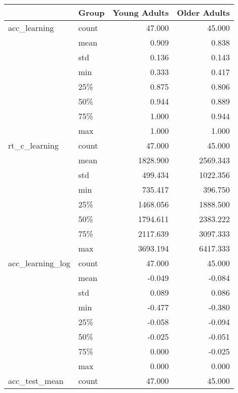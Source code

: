 \begin{tabular}{llrr}
\toprule
                  & Group &  Young Adults &  Older Adults \\
\midrule
acc\_learning & count &        47.000 &        45.000 \\
                  & mean &         0.909 &         0.838 \\
                  & std &         0.136 &         0.143 \\
                  & min &         0.333 &         0.417 \\
                  & 25\% &         0.875 &         0.806 \\
                  & 50\% &         0.944 &         0.889 \\
                  & 75\% &         1.000 &         0.944 \\
                  & max &         1.000 &         1.000 \\
rt\_c\_learning & count &        47.000 &        45.000 \\
                  & mean &      1828.900 &      2569.343 \\
                  & std &       499.434 &      1022.356 \\
                  & min &       735.417 &       396.750 \\
                  & 25\% &      1468.056 &      1888.500 \\
                  & 50\% &      1794.611 &      2383.222 \\
                  & 75\% &      2117.639 &      3097.333 \\
                  & max &      3693.194 &      6417.333 \\
acc\_learning\_log & count &        47.000 &        45.000 \\
                  & mean &        -0.049 &        -0.084 \\
                  & std &         0.089 &         0.086 \\
                  & min &        -0.477 &        -0.380 \\
                  & 25\% &        -0.058 &        -0.094 \\
                  & 50\% &        -0.025 &        -0.051 \\
                  & 75\% &         0.000 &        -0.025 \\
                  & max &         0.000 &         0.000 \\
acc\_test\_mean & count &        47.000 &        45.000 \\

\end{tabular}
